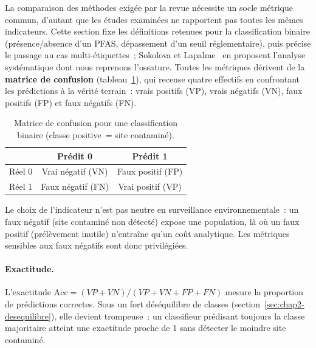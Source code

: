 \label{sec:chap2-metriques}

La comparaison des m\'ethodes exig\'ee par la revue n\'ecessite un socle m\'etrique commun, d'autant que les \'etudes examin\'ees ne rapportent pas toutes les m\^emes indicateurs.
Cette section fixe les d\'efinitions retenues pour la classification binaire (pr\'esence/absence d'un PFAS, d\'epassement d'un seuil r\'eglementaire), puis pr\'ecise le passage au cas multi-\'etiquettes~; Sokolova et Lapalme~\cite{sokolova2009metrics} en proposent l'analyse syst\'ematique dont nous reprenons l'ossature.
Toutes les m\'etriques d\'erivent de la \textbf{matrice de confusion} (tableau~\ref{tab:confusion}), qui recense quatre effectifs en confrontant les pr\'edictions \`a la v\'erit\'e terrain~: vrais positifs (VP), vrais n\'egatifs (VN), faux positifs (FP) et faux n\'egatifs (FN).

\begin{table}[H]
    \centering
    \caption{Matrice de confusion pour une classification binaire (classe positive~= site contamin\'e).}
    \label{tab:confusion}
    \begin{tabular}{lcc}
        \hline
        & Pr\'edit 0 & Pr\'edit 1 \\
        \hline
        R\'eel 0 & Vrai n\'egatif (VN) & Faux positif (FP) \\
        R\'eel 1 & Faux n\'egatif (FN) & Vrai positif (VP) \\
        \hline
    \end{tabular}
\end{table}

Le choix de l'indicateur n'est pas neutre en surveillance environnementale~: un faux n\'egatif (site contamin\'e non d\'etect\'e) expose une population, l\`a o\`u un faux positif (pr\'el\`evement inutile) n'entra\^ine qu'un co\^ut analytique.
Les m\'etriques sensibles aux faux n\'egatifs sont donc privil\'egi\'ees.

\paragraph{Exactitude.}
L'exactitude $\mathrm{Acc} = (VP+VN)/(VP+VN+FP+FN)$ mesure la proportion de pr\'edictions correctes.
Sous un fort d\'es\'equilibre de classes (section~\ref{sec:chap2-desequilibre}), elle devient trompeuse~: un classifieur pr\'edisant toujours la classe majoritaire atteint une exactitude proche de 1 sans d\'etecter le moindre site contamin\'e.

